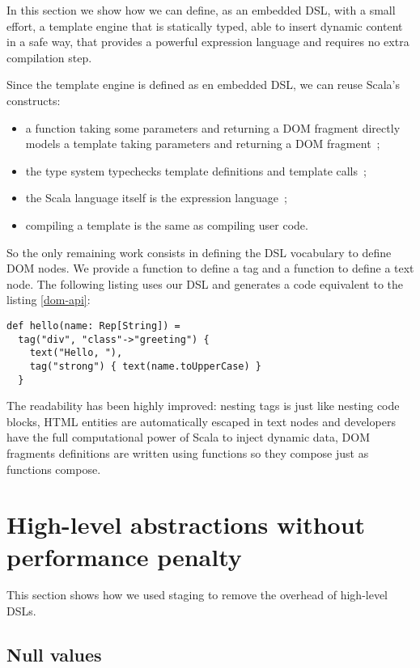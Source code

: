 \documentclass[american,english,runningheads]{llncs}
\begin{document}
In this section we show how we can define, as an embedded DSL, with a small effort, a template engine that is statically typed, able to insert dynamic content in a safe way, that provides a powerful expression language and requires no extra compilation step.

Since the template engine is defined as en embedded DSL, we can reuse Scala’s constructs:

\begin{itemize}
\item a function taking some parameters and returning a DOM fragment directly models a template taking parameters and returning a DOM fragment~;
\item the type system typechecks template definitions and template calls~;
\item the Scala language itself is the expression language~;
\item compiling a template is the same as compiling user code.
\end{itemize}

So the only remaining work consists in defining the DSL vocabulary to define DOM nodes. We provide a  function to define a tag and a  function to define a text node. The following listing uses our DSL and generates a code equivalent to the listing \ref{dom-api}:

\begin{lstlisting}[label=forest-hello,caption=DOM definition DSL]
def hello(name: Rep[String]) =
  tag("div", "class"->"greeting") {
    text("Hello, "),
    tag("strong") { text(name.toUpperCase) }
  }
\end{lstlisting}

The readability has been highly improved: nesting tags is just like nesting code blocks, HTML entities are automatically escaped in text nodes and developers have the full computational power of Scala to inject dynamic data, DOM fragments definitions are written using functions so they compose just as functions compose.

\section{High-level abstractions without performance penalty}

This section shows how we used staging to remove the overhead of high-level DSLs.

\subsection{Null values}
\end{document}
